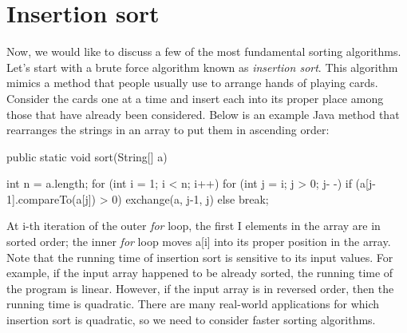 \section{Insertion sort}

Now, we would like to discuss a few of the most fundamental sorting algorithms. 
Let’s start with a brute force algorithm known as \textit{insertion sort}. This algorithm mimics a method that people usually use to arrange hands of playing cards. Consider the cards one at a time and insert each into its proper place among those that have already been considered. Below is an example Java method that rearranges the strings in an array to put them in ascending order:

\begin{code}
public static void sort(String[] a)
{
	int n = a.length;
	for (int i = 1; i < n; i++)
		for (int j = i; j > 0; j- -)
			if (a[j-1].compareTo(a[j]) > 0)
				exchange(a, j-1, j)
			else break;

}
 
\end{code}
 
 
 At i-th iteration of the outer \textit{for} loop, the first I elements in the array are in sorted order; the inner \textit{for} loop moves a[i] into its proper position in the array. Note that the running time of insertion sort is sensitive to its input values. For example, if the input array happened to be already sorted, the running time of the program is linear. However, if the input array is in reversed order, then the running time is quadratic. There are many real-world applications for which insertion sort is quadratic, so we need to consider faster sorting algorithms.

